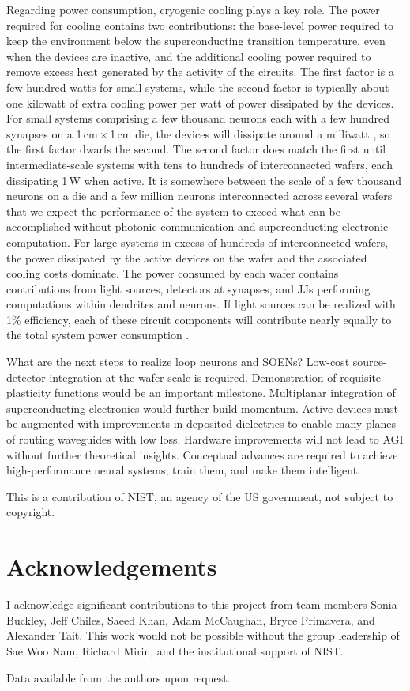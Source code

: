 \documentclass[twocolumn]{article}
\begin{document}
Regarding power consumption, cryogenic cooling plays a key role. The power required for cooling  contains two contributions: the base-level power required to keep the environment below the superconducting transition temperature, even when the devices are inactive, and the additional cooling power required to remove excess heat generated by the activity of the circuits. The first factor is a few hundred watts for small systems, while the second factor is typically about one kilowatt of extra cooling power per watt of power dissipated by the devices. For small systems comprising a few thousand neurons each with a few hundred synapses on a 1\,cm\,$\times$\,1\,cm die, the devices will dissipate around a milliwatt \cite{sh2019}, so the first factor dwarfs the second. The second factor does match the first until intermediate-scale systems with tens to hundreds of interconnected wafers, each dissipating 1\,W when active. It is somewhere between the scale of a few thousand neurons on a die and a few million neurons interconnected across several wafers that we expect the performance of the system to exceed what can be accomplished without photonic communication and superconducting electronic computation. For large systems in excess of hundreds of interconnected wafers, the power dissipated by the active devices on the wafer and the associated cooling costs dominate. The power consumed by each wafer contains contributions from light sources, detectors at synapses, and JJs performing computations within dendrites and neurons. If light sources can be realized with 1\% efficiency, each of these circuit components will contribute nearly equally to the total system power consumption \cite{sh2020}.

What are the next steps to realize loop neurons and SOENs? Low-cost source-detector integration at the wafer scale is required. Demonstration of requisite plasticity functions would be an important milestone. Multiplanar integration of superconducting electronics would further build momentum. Active devices must be augmented with improvements in deposited dielectrics to enable many planes of routing waveguides with low loss. Hardware improvements will not lead to AGI without further theoretical insights. Conceptual advances are required to achieve high-performance neural systems, train them, and make them intelligent.

\vspace{2em}
\noindent This is a contribution of NIST, an agency of the US government, not subject to copyright.

\section{\label{sec:acknowledgements}Acknowledgements}
I acknowledge significant contributions to this project from team members Sonia Buckley, Jeff Chiles, Saeed Khan, Adam McCaughan, Bryce Primavera, and Alexander Tait. This work would not be possible without the group leadership of Sae Woo Nam, Richard Mirin, and the institutional support of NIST.

\vspace{2em}
\noindent Data available from the authors upon request.



\end{document}
